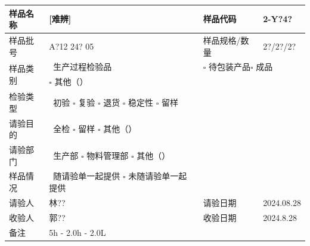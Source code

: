 \documentclass[UTF8,10pt,a4paper,fontset=fandol]{ctexart}
\newcommand{\fieldvalue}[1]{#1}
\newcommand{\handwritten}[1]{#1}
\begin{document}
\begin{center}
\small
\begin{tabular}{|p{2.5cm}|p{5.0cm}|p{2.5cm}|p{5.0cm}|}
\hline
样品名称 &
\fieldvalue{\handwritten{[难辨]}} &
样品代码 &
\fieldvalue{\handwritten{2-Y?4?}} \\
\hline
样品批号 &
\fieldvalue{\handwritten{A?12 24? 05}} &
样品规格/数量 &
\fieldvalue{\handwritten{2?/2?/2?}} \\
\hline
\multirow{2}{*}{样品类别} &
\fieldvalue{\checkmark}\ 生产过程检验品
& \multicolumn{2}{l|}{\(\square\) 待包装产品\qquad \(\square\) 成品} \\
& \(\square\) 其他（\hspace{2cm}） & \multicolumn{2}{l|}{} \\
\hline
检验类型 &
\fieldvalue{\checkmark}\ 初验
\qquad \(\square\) 复验
\qquad \(\square\) 退货
\qquad \(\square\) 稳定性
\qquad \(\square\) 留样
& \multicolumn{2}{l|}{} \\
\hline
请验目的 &
\fieldvalue{\checkmark}\ 全检
\qquad \(\square\) 留样
\qquad \(\square\) 其他（\hspace{2cm}）
& \multicolumn{2}{l|}{} \\
\hline
请验部门 &
\fieldvalue{\checkmark}\ 生产部
\qquad \(\square\) 物料管理部
\qquad \(\square\) 其他（\hspace{2cm}）
& \multicolumn{2}{l|}{} \\
\hline
样品情况 &
\fieldvalue{\checkmark}\ 随请验单一起提供
\qquad \(\square\) 未随请验单一起提供
& \multicolumn{2}{l|}{} \\
\hline
请验人 &
\fieldvalue{\handwritten{林??}} &
请验日期 &
\fieldvalue{\handwritten{2024.08.28}} \\
\hline
收验人 &
\fieldvalue{\handwritten{郭??}} &
收验日期 &
\fieldvalue{\handwritten{2024.8.28}} \\
\hline
备注 &
\fieldvalue{\handwritten{5h - 2.0h - 2.0L}} &
\multicolumn{2}{l|}{} \\
\hline
\end{tabular}
\end{center}
\end{document}
